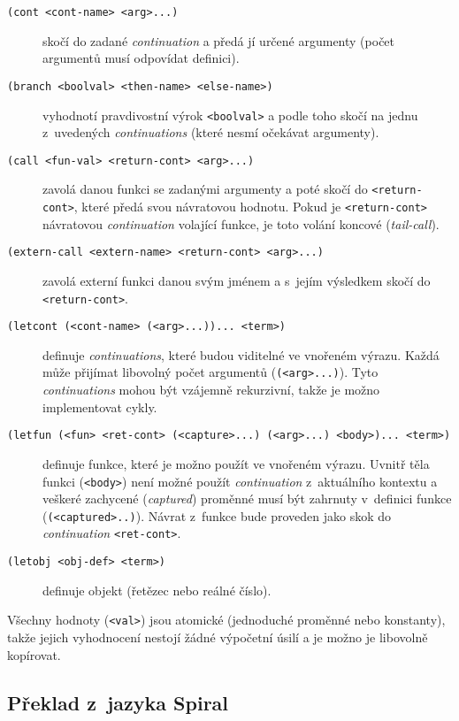 \begin{description}
\item[\texttt{(cont <cont-name> <arg>...)}] skočí do zadané \emph{continuation}
  a předá jí určené argumenty (počet argumentů musí odpovídat definici).

\item[\texttt{(branch <boolval> <then-name> <else-name>)}] vyhodnotí
  pravdivostní výrok \texttt{<boolval>} a podle toho skočí na jednu z~uvedených
  \emph{continuations} (které nesmí očekávat argumenty).

\item[\texttt{(call <fun-val> <return-cont> <arg>...)}] zavolá danou funkci se
  zadanými argumenty a poté skočí do \texttt{<return-cont>}, které předá svou
  návratovou hodnotu. Pokud je \texttt{<return-cont>} návratovou
  \emph{continuation} volající funkce, je toto volání koncové
  (\emph{tail-call}).

\item[\texttt{(extern-call <extern-name> <return-cont> <arg>...)}] zavolá
  externí funkci danou svým jménem a s~jejím výsledkem skočí do
  \texttt{<return-cont>}.

\item[\texttt{(letcont (<cont-name> (<arg>...))... <term>)}] definuje
  \emph{continuations}, které budou viditelné ve vnořeném výrazu. Každá může
  přijímat libovolný počet argumentů (\texttt{(<arg>...)}). Tyto
  \emph{continuations} mohou být vzájemně rekurzivní, takže je možno
  implementovat cykly.

\item[\texttt{(letfun (<fun> <ret-cont> (<capture>...) (<arg>...) <body>)...
  <term>)}] definuje funkce, které je možno použít ve vnořeném výrazu. Uvnitř těla
  funkci (\texttt{<body>}) není možné použít \emph{continuation} z~aktuálního
  kontextu a veškeré zachycené (\emph{captured}) proměnné musí být zahrnuty
  v~definici funkce (\texttt{(<captured>..)}). Návrat z~funkce bude proveden jako
  skok do \emph{continuation} \texttt{<ret-cont>}.

\item[\texttt{(letobj <obj-def> <term>)}] definuje objekt (řetězec nebo
  reálné číslo).
\end{description}

Všechny hodnoty (\texttt{<val>}) jsou atomické (jednoduché proměnné nebo
konstanty), takže jejich vyhodnocení nestojí žádné výpočetní úsilí a je možno je
libovolně kopírovat.

\subsection{Překlad z~jazyka Spiral}

